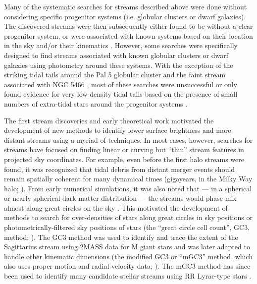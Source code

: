 \documentclass[final,5p,times,twocolumn,authoryear]{elsarticle}
\begin{document}
Many of the systematic searches for streams described above were done without
considering specific progenitor systems (i.e. globular clusters or dwarf galaxies).
The discovered streams were then subsequently either found to be without a clear
progenitor system, or were associated with known systems based on their location in the
sky and/or their kinematics \citep{todo}.
However, some searches were specifically designed to find streams associated with known
globular clusters or dwarf galaxies \citep{Grillmair:1990, todo} using photometry around
these systems.
With the exception of the striking tidal tails around the Pal 5 globular cluster
\citep{Odenkirchen:2002} and the faint stream associated with NGC 5466
\citep{Grillmair:2006-ngc5466}, most of these searches were unsuccessful or only found
evidence for very low-density tidal tails based on the presence of small numbers of
extra-tidal stars around the progenitor systems \citep{Grillmair:TODO}.

The first stream discoveries and early theoretical work motivated the development of
new methods to identify lower surface brightness and more distant streams using a myriad
of techniques.
In most cases, however, searches for streams have focused on finding linear or curving
but ``thin'' stream features in projected sky coordinates.
For example, even before the first halo streams were found, it was recognized that tidal
debris from distant merger events should remain spatially coherent for many dynamical
times (gigayears, in the Milky Way halo; \citealt{Johnston:199X, Helmi:1999}).
From early numerical simulations, it was also noted that --- in a spherical or
nearly-spherical dark matter distribution --- the streams would phase mix almost along
great circles on the sky \citep{Johnston:1996, Ibata:XXXX, others}.
This motivated the development of methods to search for over-densities of stars along
great circles in sky positions or photometrically-filtered sky positions of stars (the
``great circle cell count'', GC3, method; \citealt{Johnston:1996}).
The GC3 method was used to identify and trace the extent of the Sagittarius stream using
2MASS data for M giant stars \citep{Majewski:2003} and was later adapted to handle other
kinematic dimensions (the modified GC3 or ``mGC3'' method, which also uses proper motion
and radial velocity data; \citealt{Mateu:2011}).
The mGC3 method has since been used to identify many candidate stellar streams using RR
Lyrae-type stars \citep{Mateu:2018}.
\end{document}
